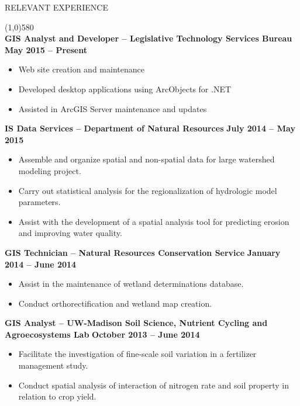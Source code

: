 \documentclass{article}
\begin{document}
\noindent \large{RELEVANT EXPERIENCE}\\ \begin{small}
\line(1,0){580}\\
	\noindent \textbf{GIS Analyst and Developer -- Legislative Technology Services Bureau} \hfill \textbf{May 2015 -- Present}
	\begin{itemize}
		\item Web site creation and maintenance
		\item Developed desktop applications using ArcObjects for .NET
		\item Assisted in ArcGIS Server maintenance and updates
	\end{itemize}
	\noindent \textbf{IS Data Services -- Department of Natural Resources} \hfill \textbf{July 2014 -- May 2015}
	\begin{itemize}
		\item Assemble and organize spatial and non-spatial data for large watershed modeling project.
		\item Carry out statistical analysis for the regionalization of hydrologic model parameters. 
		\item Assist with the development of a spatial analysis tool 
		 for predicting erosion and improving water quality.
	\end{itemize}
	\noindent \textbf{GIS Technician -- Natural Resources Conservation Service} \hfill \textbf{January 2014 -- June 2014}
	\begin{itemize}
		\item Assist in the maintenance of wetland determinations database.
		\item Conduct orthorectification and wetland map creation. 
	\end{itemize}
	\noindent \textbf{GIS Analyst -- UW-Madison Soil Science, Nutrient Cycling and Agroecosystems Lab} \hfill \textbf{October 2013 -- June 2014}
	\begin{itemize}
		\item Facilitate the investigation of fine-scale soil variation in a fertilizer management study.
		\item Conduct spatial analysis of interaction of nitrogen rate and soil property in relation to crop yield.

\end{itemize}
\end{small}
\end{document}
